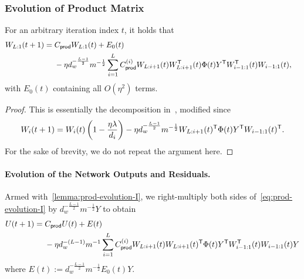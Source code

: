 \subsubsection{Evolution of Product Matrix} \label{sec:iteration of WL1}
\begin{lemma}
	\label{lemma:prod-evolution-I}
	For an arbitrary iteration index $t$, it holds that
	\begin{align}
		W_{L:1}(t+1) &=
    \begin{aligned}[t]
         & C_{\mathsf{prod}} W_{L:1}(t) + E_0(t) \\
         & - \eta d_w^{-\frac{L-1}{2}}m^{-\frac{1}{2}}
			     \sum_{i=1}^L
			     C_{\mathsf{prod}}^{({i})}
			     W_{L:i+1}(t) W_{L:i+1}^{\mathsf{T}}(t) \Phi(t) Y^{\mathsf{T}} W_{i-1:1}^{\mathsf{T}}(t) W_{i-1:1}(t),
    \end{aligned}
    \label{eq:prod-evolution-I}
	\end{align}
	with $E_0(t)$ containing all $O(\eta^2)$ terms.
\end{lemma}
\begin{proof}
	This is essentially the decomposition in~\citep[Section 5]{du2019width}, modified since
	\begin{equation}
		W_i(t+1)
		= W_i(t)\left(1-\frac{\eta\lambda}{d_i}\right) - \eta
		d_w^{-\frac{L-1}{2}}m^{-\frac{1}{2}} W_{L:i+1}(t)^{\mathsf{T}} \Phi(t) Y^{\mathsf{T}} W_{i-1:1}(t)^{\mathsf{T}}.
	\end{equation}
    For the sake of brevity, we do not repeat the argument here.
\end{proof}

\paragraph{Evolution of the Network Outputs and Residuals.}
\label{sec:evolution of res}
Armed with~\cref{lemma:prod-evolution-I}, we right-multiply
both sides of~\eqref{eq:prod-evolution-I} by $d_w^{-\frac{L-1}{2}}m^{-\frac{1}{2}} Y$ to obtain
\begin{equation}
	U(t+1) = \begin{aligned}[t] 
    &C_{\mathsf{prod}} U(t) + E(t)  \\
    & - \eta d_w^{-(L-1)}m^{-1}
	  \sum_{i=1}^L
	C_{\mathsf{prod}}^{({i})}
    W_{L:i+1}(t) W_{L:i+1}(t)^{\mathsf{T}} \Phi(t) Y^{\mathsf{T}} W_{i-1:1}^{\mathsf{T}}(t) W_{i-1:1}(t)Y
  \end{aligned}
	\label{eq:prod-evolution-I-U}
\end{equation}
where $E(t) := d_w^{-\frac{L-1}{2}}m^{-\frac{1}{2}} E_0(t)Y$.

